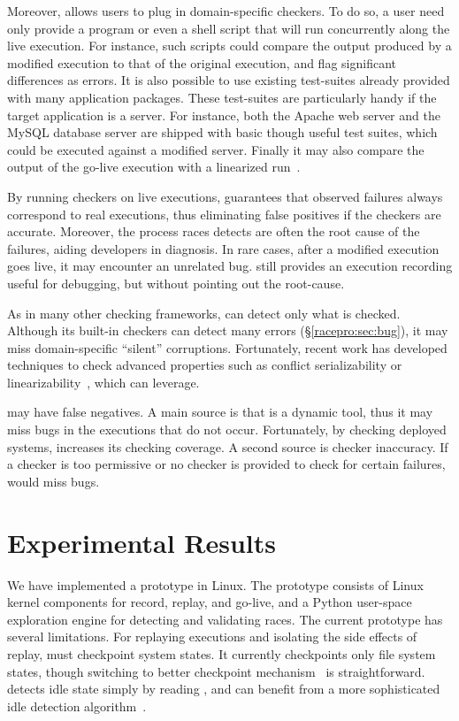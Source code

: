 Moreover, \racepro allows users to plug in domain-specific checkers. To do
so, a user need only provide a program or even a shell script that
will run concurrently along the live execution. For instance, such
scripts could compare the output produced by a modified execution to that
of the original execution, and flag significant differences as errors.
It is also possible to use existing test-suites already provided
with many application packages.  These test-suites are particularly handy if
the target application is a server. For instance, both the Apache web
server and the MySQL database server are shipped with basic though
useful test suites, which could be executed against a modified server.
Finally it may also compare the output of the go-live execution with a
linearized run~\cite{linearizable:eurosys11}.

By running checkers on live executions, \racepro guarantees that observed
failures always correspond to real executions, thus eliminating false
positives if the checkers are accurate.  Moreover, the process races \racepro
detects are often the root cause of the failures, aiding developers in
diagnosis.  In rare cases, after a modified execution goes live, it may
encounter an unrelated bug.  \racepro still provides an execution recording
useful for debugging, but without pointing out the root-cause.

As in many other checking frameworks, \racepro can detect only what is checked.
Although its built-in checkers can detect many errors
(\S\ref{racepro:sec:bug}), it may miss domain-specific ``silent''
corruptions.  Fortunately, recent work has developed techniques to check
advanced properties such as conflict serializability or
linearizability~\cite{linearizable:eurosys11}, which \racepro can leverage.

\racepro may have false negatives.  A main source is that \racepro is a dynamic
tool, thus it may miss bugs in the executions that do not occur.
Fortunately, by checking deployed systems, \racepro increases its checking
coverage.  A second source is checker inaccuracy.  If a checker is too
permissive or no checker is provided to check for certain failures, \racepro
would miss bugs.

\section{Experimental Results} \label{racepro:sec:eval}

We have implemented a \racepro prototype in Linux.  The prototype
consists of Linux kernel components for record, replay, and go-live, and a
Python user-space exploration engine for detecting and
validating races.  The current prototype has several limitations.  For
replaying executions and isolating the side effects of replay, \racepro
must checkpoint system states.  It currently checkpoints only file
system states, though switching to better checkpoint
mechanism~\cite{zap:osdi02} is straightforward.  \racepro detects idle
state simply by reading , and can benefit from a more
sophisticated idle detection algorithm~\cite{boinc}.

